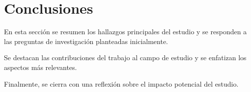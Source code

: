 \section{Conclusiones}
\label{sec:conclusiones}

En esta sección se resumen los hallazgos principales del estudio y se responden a las preguntas de investigación planteadas inicialmente.

Se destacan las contribuciones del trabajo al campo de estudio y se enfatizan los aspectos más relevantes.

Finalmente, se cierra con una reflexión sobre el impacto potencial del estudio.